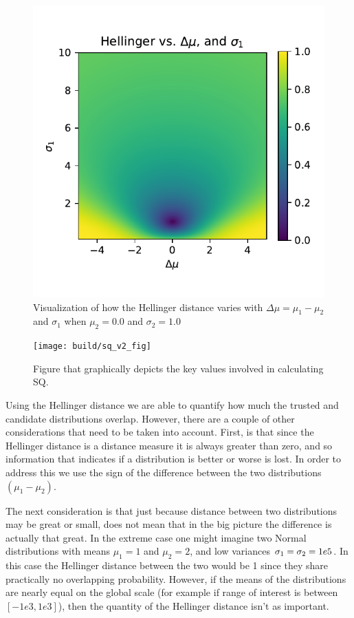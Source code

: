 \begin{figure}[tbp]
    \centering
    \includegraphics[width=0.9\linewidth]{Figures/hellinger_surf}
    \caption{Visualization of how the Hellinger distance varies with $\Delta\mu=\mu_1-\mu_2$ and $\sigma_1$ when $\mu_2=0.0$ and $\sigma_2=1.0$}
    \label{fig:hellinger_surf}
\end{figure}
\begin{figure}[tbp]
    \centering
    \texttt{[image: build/sq\_v2\_fig]}
    \caption{Figure that graphically depicts the key values involved in calculating SQ.}
    \label{fig:hellinger_surf}
\end{figure}

Using the Hellinger distance we are able to quantify how much the trusted and candidate distributions overlap. However, there are a couple of other considerations that need to be taken into account. First, is that since the Hellinger distance is a distance measure it is always greater than zero, and so information that indicates if a distribution is better or worse is lost. In order to address this we use the sign of the difference between the two distributions $(\mu_1-\mu_2)$.

The next consideration is that just because distance between two distributions may be great or small, does not mean that in the big picture the difference is actually that great. In the extreme case one might imagine two Normal distributions with means $\mu_1=1$ and $\mu_2=2$, and low variances $\sigma_1=\sigma_2=1e\-5$. In this case the Hellinger distance between the two would be 1 since they share practically no overlapping probability. However, if the means of the distributions are nearly equal on the global scale (for example if range of interest is between $[-1e3,1e3]$), then the quantity of the Hellinger distance isn't as important.


